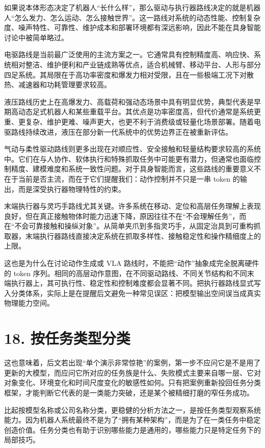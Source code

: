 如果说本体形态决定了机器人“长什么样”，那么驱动与执行器路线决定的就是机器人“怎么发力、怎么运动、怎么接触世界”。这一路线对系统的动态性能、控制复杂度、噪声特性、可靠性、维护成本和部署环境都有深远影响，因此不能在具身智能讨论中被简单略过。

电驱路线是当前最广泛使用的主流方案之一。它通常具有控制精度高、响应快、系统相对整洁、维护便利和产业链成熟等优点，适合机械臂、移动平台、人形与部分四足系统。其局限在于高功率密度和爆发力相对受限，且在一些极端工况下对散热、减速器和功耗管理要求较高。

液压路线历史上在高爆发力、高载荷和强动态场景中具有明显优势，典型代表是早期高动态足式机器人和某些重载平台。其优点是功率密度高，但代价通常是系统更重、更复杂、维护更难、噪声更大，也更不利于消费级或轻量化场景部署。随着电驱路线持续改进，液压在部分新一代系统中的优势边界正在被重新评估。

气动与柔性驱动路线则更多出现在对顺应性、安全接触和轻量结构要求较高的系统中。它们在与人协作、软体执行和特殊抓取任务中可能更有潜力，但通常也面临控制精度、建模难度和系统一致性问题。对于具身智能而言，这些路线的重要意义不在于当前是否主流，而在于它们提醒我们：动作控制并不只是一串 token 的输出，而是深受执行器物理特性的约束。

末端执行器与灵巧手路线尤其关键。许多系统在移动、定位和高层任务理解上表现良好，但在真正接触物体时能力迅速下降，原因往往不在“不会理解任务”，而在“不会可靠接触和操纵对象”。从简单夹爪到多指灵巧手，从固定治具到可重构抓取器，末端执行器路线直接决定系统在抓取多样性、接触稳定性和操作精细度上的上限。

这也是为什么在讨论动作生成或 VLA 路线时，不能把“动作”抽象成完全脱离硬件的 token 序列。相同的高层动作意图，在不同驱动路线、不同关节结构和不同末端执行器上，其可执行性、稳定性和控制难度都会显著不同。把执行器路线显式写入分类体系，实际上是在提醒后文避免一种常见误区：把模型输出空间误当成真实物理能力空间。

\section*{18. 按任务类型分类}

这也意味着，后文若出现“单个演示非常惊艳”的案例，第一步不应问它是不是用了更新的大模型，而应问它所对应的任务族是什么、失败模式主要来自哪一层、它对对象变化、环境变化和时间尺度变化的敏感性如何。只有把案例重新投回任务分类框架，才能判断它代表的是一类能力突破，还是某个被精细打磨的窄任务成功。

比起按模型名称或公司名称分类，更稳健的分析方法之一，是按任务类型观察系统能力。因为机器人系统最终不是为了“拥有某种架构”，而是为了在一类任务中稳定创造价值。任务分类也有助于识别哪些能力是通用的，哪些能力只是特定任务下的局部技巧。

